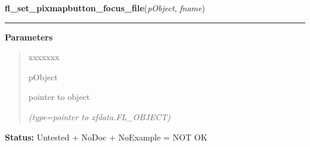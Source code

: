     \label{xformslib:library:fl_set_pixmapbutton_focus_file}

    \vspace{0.5ex}

\hspace{.8\funcindent}\begin{boxedminipage}{\funcwidth}

    \raggedright \textbf{fl\_set\_pixmapbutton\_focus\_file}(\textit{pObject}, \textit{fname})

    \vspace{-1.5ex}

    \rule{\textwidth}{0.5\fboxrule}
\setlength{\parskip}{2ex}
\setlength{\parskip}{1ex}
      \textbf{Parameters}
      \vspace{-1ex}

      \begin{quote}
        \begin{Ventry}{xxxxxxx}

          \item[pObject]

          pointer to object

            {\it (type=pointer to xfdata.FL\_OBJECT)}

        \end{Ventry}

      \end{quote}

\textbf{Status:} Untested + NoDoc + NoExample = NOT OK



    \end{boxedminipage}

    \label{xformslib:library:fl_set_pixmapbutton_focus_pixmap}

    \vspace{0.5ex}

